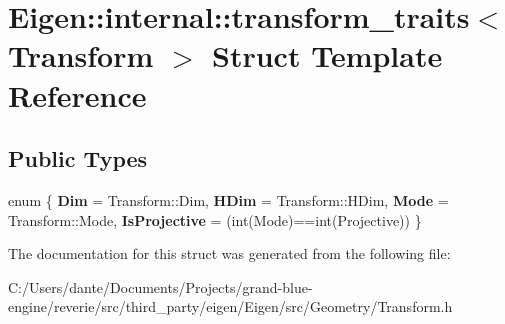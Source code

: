 \hypertarget{struct_eigen_1_1internal_1_1transform__traits}{}\section{Eigen\+::internal\+::transform\+\_\+traits$<$ Transform $>$ Struct Template Reference}
\label{struct_eigen_1_1internal_1_1transform__traits}
\subsection*{Public Types}
\begin{DoxyCompactItemize}
\item 
\mbox{\label{struct_eigen_1_1internal_1_1transform__traits_aea33bf49404cb786e81da762e4ff1b62}} 
enum \{ {\bfseries Dim} = Transform\+::Dim, 
{\bfseries H\+Dim} = Transform\+::H\+Dim, 
{\bfseries Mode} = Transform\+::Mode, 
{\bfseries Is\+Projective} = (int(Mode)==int(Projective))
 \}
\end{DoxyCompactItemize}


The documentation for this struct was generated from the following file\+:\begin{DoxyCompactItemize}
\item 
C\+:/\+Users/dante/\+Documents/\+Projects/grand-\/blue-\/engine/reverie/src/third\+\_\+party/eigen/\+Eigen/src/\+Geometry/Transform.\+h\end{DoxyCompactItemize}
